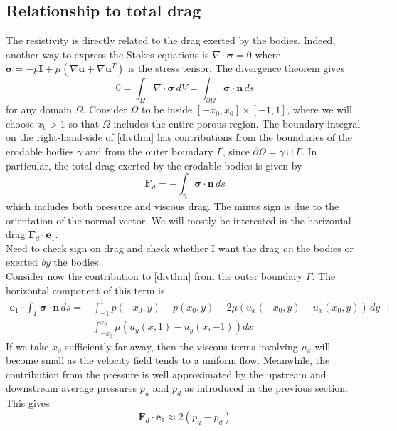 \documentclass[3p]{elsarticle}
\newcommand{\nick}[1]{ {\color{red} #1} }
\newcommand{\grad}{{\nabla}}
\newcommand{\nn}{{\mathbf{n}}}
\newcommand{\uu}{{\mathbf{u}}}
\newcommand{\bvec}[1]{\mathbf{#1}}
\newcommand{\pup}{p_u}
\newcommand{\pdn}{p_d}
\newcommand{\stress}{{\boldsymbol \sigma}}
\newcommand{\FD}{\bvec{F}_d}
\newcommand{\ex}{ {\bvec{e}}_1}
\begin{document}

\subsection{Relationship to total drag}

The resistivity is directly related to the drag exerted by the bodies. Indeed, another way to express the Stokes equations is $\grad \cdot \stress = 0$ where $\stress = -p \bvec{I} + \mu \left( \grad \uu + \grad \uu^T \right)$ is the stress tensor. The divergence theorem gives
\begin{equation}
\label{divthm}
0 = \int_{\Omega} \grad \cdot \stress \, dV 
= \int_{\partial \Omega} \stress \cdot \nn \, ds
\end{equation}
for any domain $\Omega$.  Consider $\Omega$ to be inside $[-x_0, x_0] \times [-1, 1]$, where we will choose $x_0 > 1$ so that $\Omega$ includes the entire porous region.
The boundary integral on the right-hand-side of \eqref{divthm} has contributions from the boundaries of the erodable bodies $\gamma$ and from the outer boundary $\Gamma$, since $\partial \Omega = \gamma \cup \Gamma$. In particular, the total drag exerted by the erodable bodies is given by
\begin{equation}
\FD = -\int_{\gamma} \stress \cdot \nn \, ds
\end{equation}
which includes both pressure and viscous drag. The minus sign is due to the orientation of the normal vector. We will mostly be interested in the horizontal drag $\FD \cdot \ex$. \\

\nick{Need to check sign on drag and check whether I want the drag {\em on} the bodies or exerted {\em by} the bodies.} \\

Consider now the contribution to \eqref{divthm} from the outer boundary $\Gamma$. The horizontal component of this term is
\begin{align}
\ex \cdot \int_{\Gamma} \stress \cdot \nn \, ds = 
& \int_{-1}^{1} p(-x_0, y) - p(x_0, y) - 2\mu (u_x(-x_0,y) - u_x(x_0,y)) \, dy \, + \\
& \int_{-x_0}^{x_0} \mu (u_y(x,1) - u_y(x,-1)) dx
\end{align}
If we take $x_0$ sufficiently far away, then the viscous terms involving $u_x$ will become small as the velocity field tends to a uniform flow. Meanwhile, the contribution from the pressure is well approximated by the upstream and downstream average pressures $\pup$ and $\pdn$ as introduced in the previous section. This gives 
\begin{equation}
\FD \cdot \ex \approx 2 (\pup - \pdn)
\end{equation}
\end{document}
